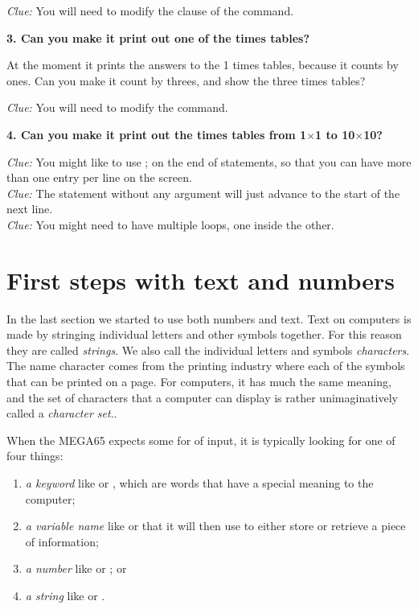   {\em Clue:} You will need to modify the  clause of the  command.
  
  
  {\bf 3. Can you make it print out one of the times tables?}
  
  At the moment it prints the answers to the 1 times tables, because it counts by ones.
  Can you make it count by threes, and show the three times tables?
  
  {\em Clue:} You will need to modify the  command.
  
  {\bf 4. Can you make it print out the times tables from 1$\times$1 to 10$\times$10?}
  
  {\em Clue:} You might like to use ; on the end of  statements, so that you can have
  more than one entry per line on the screen.\\
  {\em Clue:} The  statement without any argument will just advance to the start of the next line.\\
  {\em Clue:} You might need to have multiple  loops, one inside the other.
  
\section{First steps with text and numbers}

In the last section we started to use both numbers and text.  Text on computers is made by stringing individual letters
and other symbols together.  For this reason they are called {\em strings}.  We also call the individual letters and
symbols {\em characters}.  The name character comes from the printing industry where each of the symbols that can be
printed on a page. For computers, it has much the same meaning, and the set of characters that a computer can display
is rather unimaginatively called a {\em character set}..

When the MEGA65 expects some for of input, it is typically looking for one of four things:

\begin{enumerate}
\item {\em a keyword} like  or , which are words that have a special meaning to the computer;
\item {\em a variable name} like  or  that it will then use to either store or retrieve a piece of information;
\item {\em a number} like  or ; or
\item {\em a string} like  or .
\end{enumerate}

